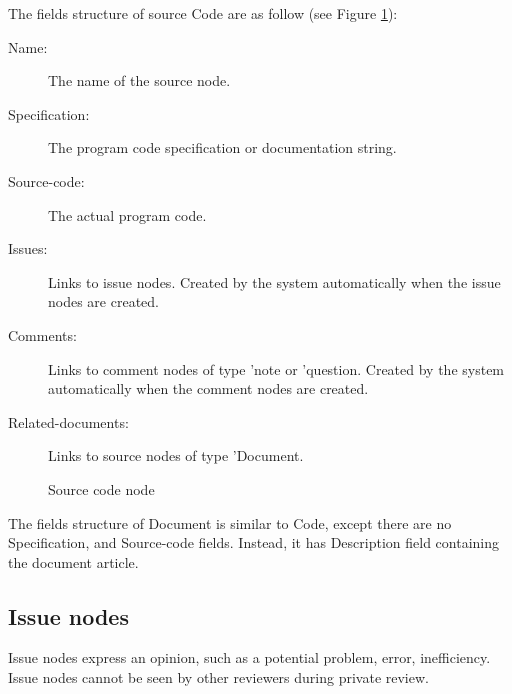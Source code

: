 \noindent The fields structure of source Code are as follow (see
Figure \ref{source-code}):
\begin{description}
\item [Name:] The name of the source node.
\item [Specification:] The program code specification or documentation string.
\item [Source-code:] The actual program code.
\item [Issues:] Links to issue nodes. Created by the system
automatically when the issue nodes are created.
\item [Comments:] Links to comment nodes of type 'note or
'question. Created by the system automatically when the comment nodes
are created. 
\item [Related-documents:] Links to source nodes of type 'Document.
\end{description}

\begin{figure}[htpb]
  {\centerline{}}
  \caption{Source code node}
  \label{source-code}
\end{figure}
The fields structure of Document is similar to Code, except there
are no Specification, and Source-code fields. Instead, it has
Description field containing the document article.

\subsection {Issue nodes}
Issue nodes express an opinion, such as a potential problem, error,
inefficiency. Issue nodes cannot be seen by other reviewers during
private review. 

